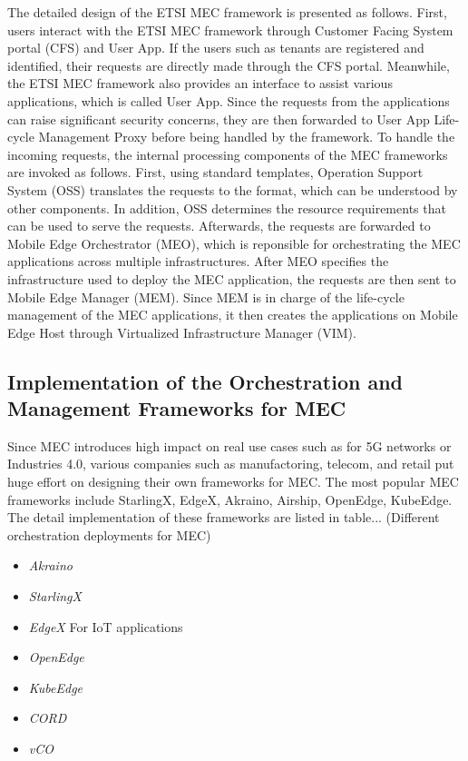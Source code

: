 The detailed design of the ETSI MEC framework is presented as follows. 
First, users interact with the ETSI MEC framework through Customer Facing System portal (CFS) and User App. If the users such as tenants are registered and identified, their requests are directly made through the CFS portal. Meanwhile, the ETSI MEC framework also provides an interface to assist various applications, which is called User App. Since the requests from the applications can raise significant security concerns, they are then forwarded to User App Life-cycle Management Proxy before being handled by the framework. To handle the incoming requests, the internal processing components of the MEC frameworks are invoked as follows. First, using standard templates, Operation Support System (OSS) translates the requests to the format, which can be understood by other components. In addition, OSS determines the resource requirements that can be used to serve the requests. Afterwards, the requests are forwarded to Mobile Edge Orchestrator (MEO), which is reponsible for orchestrating the MEC applications across multiple infrastructures. After MEO specifies the infrastructure used to deploy the MEC application, the requests are then sent to Mobile Edge Manager (MEM). Since MEM is in charge of the life-cycle management of the MEC applications, it then creates the applications on Mobile Edge Host through Virtualized Infrastructure Manager (VIM).   


\subsection{Implementation of the Orchestration and Management Frameworks for MEC}

Since MEC introduces high impact on real use cases such as for 5G networks or Industries 4.0, various companies such as manufactoring, telecom, and retail put huge effort on designing their own frameworks for MEC. The most popular MEC frameworks include StarlingX, EdgeX, Akraino, Airship, OpenEdge, KubeEdge. The detail implementation of these frameworks are listed in table... (Different orchestration deployments for MEC)

\begin{itemize}

\item \textit{\textit{Akraino}}

\item \textit{\textit{StarlingX}}

\item \textit{\textit{EdgeX}} For IoT applications

\item \textit{\textit{OpenEdge}}

\item \textit{\textit{KubeEdge}}

\item \textit{\textit{CORD}}

\item \textit{\textit{vCO}}

\end{itemize}

